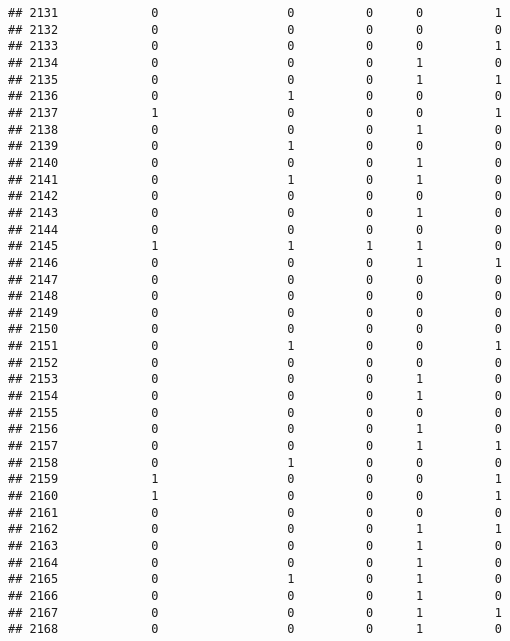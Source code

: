 \documentclass[
]{article}
\begin{document}
\begin{verbatim}
## 2131             0                  0          0      0          1
## 2132             0                  0          0      0          0
## 2133             0                  0          0      0          1
## 2134             0                  0          0      1          0
## 2135             0                  0          0      1          1
## 2136             0                  1          0      0          0
## 2137             1                  0          0      0          1
## 2138             0                  0          0      1          0
## 2139             0                  1          0      0          0
## 2140             0                  0          0      1          0
## 2141             0                  1          0      1          0
## 2142             0                  0          0      0          0
## 2143             0                  0          0      1          0
## 2144             0                  0          0      0          0
## 2145             1                  1          1      1          0
## 2146             0                  0          0      1          1
## 2147             0                  0          0      0          0
## 2148             0                  0          0      0          0
## 2149             0                  0          0      0          0
## 2150             0                  0          0      0          0
## 2151             0                  1          0      0          1
## 2152             0                  0          0      0          0
## 2153             0                  0          0      1          0
## 2154             0                  0          0      1          0
## 2155             0                  0          0      0          0
## 2156             0                  0          0      1          0
## 2157             0                  0          0      1          1
## 2158             0                  1          0      0          0
## 2159             1                  0          0      0          1
## 2160             1                  0          0      0          1
## 2161             0                  0          0      0          0
## 2162             0                  0          0      1          1
## 2163             0                  0          0      1          0
## 2164             0                  0          0      1          0
## 2165             0                  1          0      1          0
## 2166             0                  0          0      1          0
## 2167             0                  0          0      1          1
## 2168             0                  0          0      1          0

\end{verbatim}
\end{document}

